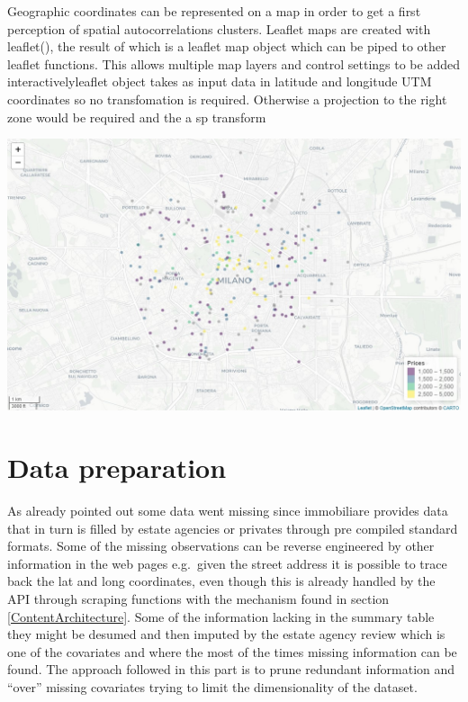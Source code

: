 \documentclass[
  12pt,
  a4paper,
  oneside]{book}
\theoremstyle{definition}
\theoremstyle{definition}
\theoremstyle{definition}
\theoremstyle{remark}
\begin{document}
Geographic coordinates can be represented on a map in order to get a first perception of spatial autocorrelations clusters.
Leaflet maps are created with leaflet(), the result of which is a leaflet map object which can be piped to other leaflet functions. This allows multiple map layers and control settings to be added interactivelyleaflet object takes as input data in latitude and longitude UTM coordinates so no transfomation is required. Otherwise a projection to the right zone would be required and the a sp transform

\includegraphics[width=1\linewidth]{images/leaflet_prezzi}

\hypertarget{data-preparation}{%
\section{Data preparation}\label{data-preparation}}

As already pointed out some data went missing since immobiliare provides data that in turn is filled by estate agencies or privates through pre compiled standard formats. Some of the missing observations can be reverse engineered by other information in the web pages e.g.~given the street address it is possible to trace back the lat and long coordinates, even though this is already handled by the API through scraping functions with the mechanism found in section \ref{ContentArchitecture}. Some of the information lacking in the summary table they might be desumed and then imputed by the estate agency review which is one of the covariates and where the most of the times missing information can be found. The approach followed in this part is to prune redundant information and ``over'' missing covariates trying to limit the dimensionality of the dataset.
\end{document}
